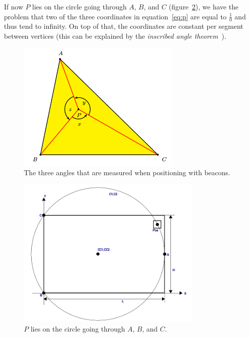 \documentclass[a4paper, 12pt]{paper}
\begin{document}
If now $P$ lies on the circle going through $A$, $B$, and
$C$ (figure~\ref{fig:p_on_circle}), we have the problem that two of the three coordinates
in equation~\ref{eq:p} are equal to $\frac{1}{0}$ and thus tend to infinity.
On top of that, the coordinates are constant per segment between vertices (this
can be explained by the
\emph{inscribed angle theorem}~\cite{wikipedia_inscribed_angle}).

\begin{figure}[H]
    \centering
    \includegraphics[width=0.7\textwidth]{three_angles}
    \caption{The three angles that are measured when positioning with beacons.}
\label{fig:three_angles}
\end{figure}

\begin{figure}[H]
    \centering
    \includegraphics[width=0.8\textwidth]{p_on_circle}
    \caption{$P$ lies on the circle going through $A$, $B$, and $C$.}
\label{fig:p_on_circle}
\end{figure}
\end{document}
